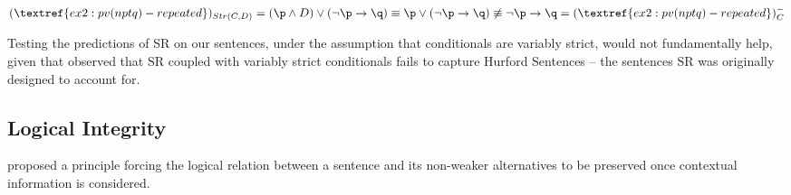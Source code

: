 \begin{exe}
\begin{xlist}
{			$(\textref{ex2:pv(nptq)-repeated})_{Str(C, D)} =  (\p \wedge D) \vee (\neg\p \rightarrow \q) \equiv \p \vee (\neg\p \rightarrow \q) \not\equiv \neg\p \rightarrow \q = (\textref{ex2:pv(nptq)-repeated})^-_C$
		}\label{ex2:pv(nptq)-repeated-sr-strict}
		\label{ex2:pv(nqtp)-repeated-sr-strict}
		\label{ex2:n(pvq)tp-repeated-sr}
	\end{xlist}
\end{exe}


Testing the predictions of SR on our sentences, under the assumption that conditionals are variably strict, would not fundamentally help, given that \citet{Kalomoiros2024} observed that SR coupled with variably strict conditionals fails to capture Hurford Sentences -- the sentences SR was originally designed to account for.



\iffalse
\subsection{Logical Integrity}

\citet{Anvari2018} proposed a principle forcing the logical relation between a sentence and its non-weaker alternatives to be preserved once contextual information is considered.

\begin{exe}
\end{exe}

